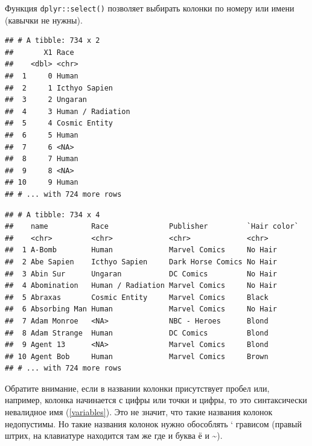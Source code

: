 \documentclass[]{book}
\newenvironment{Shaded}{\begin{snugshade}}{\end{snugshade}}
\newcommand{\KeywordTok}[1]{\textcolor[rgb]{0.13,0.29,0.53}{\textbf{#1}}}
\newcommand{\DataTypeTok}[1]{\textcolor[rgb]{0.13,0.29,0.53}{#1}}
\newcommand{\DecValTok}[1]{\textcolor[rgb]{0.00,0.00,0.81}{#1}}
\newcommand{\StringTok}[1]{\textcolor[rgb]{0.31,0.60,0.02}{#1}}
\newcommand{\OperatorTok}[1]{\textcolor[rgb]{0.81,0.36,0.00}{\textbf{#1}}}
\newcommand{\NormalTok}[1]{#1}
\begin{document}
Функция \texttt{dplyr::select()} позволяет выбирать колонки по номеру
или имени (кавычки не нужны).

\begin{Shaded}
\end{Shaded}

\begin{verbatim}
## # A tibble: 734 x 2
##       X1 Race             
##    <dbl> <chr>            
##  1     0 Human            
##  2     1 Icthyo Sapien    
##  3     2 Ungaran          
##  4     3 Human / Radiation
##  5     4 Cosmic Entity    
##  6     5 Human            
##  7     6 <NA>             
##  8     7 Human            
##  9     8 <NA>             
## 10     9 Human            
## # ... with 724 more rows
\end{verbatim}

\begin{Shaded}
\end{Shaded}

\begin{verbatim}
## # A tibble: 734 x 4
##    name          Race              Publisher         `Hair color`
##    <chr>         <chr>             <chr>             <chr>       
##  1 A-Bomb        Human             Marvel Comics     No Hair     
##  2 Abe Sapien    Icthyo Sapien     Dark Horse Comics No Hair     
##  3 Abin Sur      Ungaran           DC Comics         No Hair     
##  4 Abomination   Human / Radiation Marvel Comics     No Hair     
##  5 Abraxas       Cosmic Entity     Marvel Comics     Black       
##  6 Absorbing Man Human             Marvel Comics     No Hair     
##  7 Adam Monroe   <NA>              NBC - Heroes      Blond       
##  8 Adam Strange  Human             DC Comics         Blond       
##  9 Agent 13      <NA>              Marvel Comics     Blond       
## 10 Agent Bob     Human             Marvel Comics     Brown       
## # ... with 724 more rows
\end{verbatim}

Обратите внимание, если в названии колонки присутствует пробел или,
например, колонка начинается с цифры или точки и цифры, то это
синтаксически невалидное имя (\ref{variables}). Это не значит, что такие
названия колонок недопустимы. Но такие названия колонок нужно обособлять
` грависом (правый штрих, на клавиатуре находится там же где и буква ё и
\textasciitilde{}).
\end{document}
